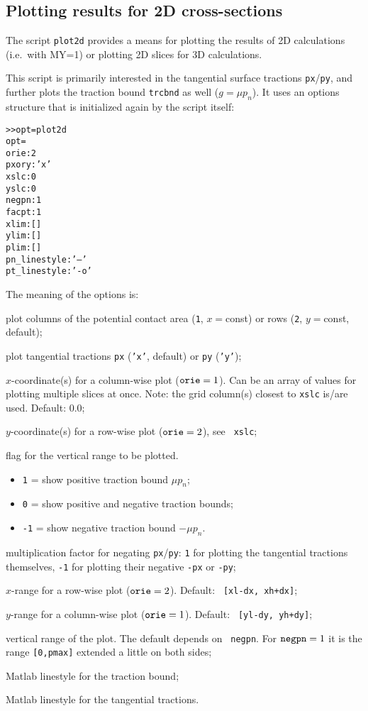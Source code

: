 \documentclass[12pt]{report}
\begin{document}
\subsection{Plotting results for 2D cross-sections}

The script {\tt plot2d} provides a means for plotting the results of 2D
calculations (i.e.\ with MY=1) or plotting 2D slices for 3D calculations.

This script is primarily interested in the tangential surface tractions
{\tt px}/{\tt py}, and further plots the traction bound {\tt trcbnd} as
well ($g=\mu p_n$). It uses an options structure that is initialized again
by the script itself:
\begin{alltt}\small
>> opt=plot2d
opt =
            orie: 2
           pxory: 'x'
            xslc: 0
            yslc: 0
           negpn: 1
           facpt: 1
            xlim: []
            ylim: []
            plim: []
    pn_linestyle: '--'
    pt_linestyle: '-o'
\end{alltt}
The meaning of the options is:
\begin{description}[leftmargin=7em,style=nextline]
\item[orie]  plot columns of the potential contact area ({\tt 1}, $x=$const) or
        rows ({\tt 2}, $y=$const, default);
\item[pxory] plot tangential tractions {\tt px} ({\tt 'x'}, default) or
        {\tt py} ({\tt 'y'});
\item[xslc]  $x$-coordinate(s) for a column-wise plot (${\tt orie}=1$). Can
        be an array of values for plotting multiple slices at once. Note:
        the grid column(s) closest to {\tt xslc} is/are used. Default: 0.0;
\item[yslc]  $y$-coordinate(s) for a row-wise plot (${\tt orie}=2$), see {\tt
        xslc};
\item[negpn] flag for the vertical range to be plotted.
\begin{itemize}
\item {\tt  1} = show positive traction bound  $\mu p_n$;
\item {\tt  0} = show positive and negative traction bounds;
\item {\tt -1} = show negative traction bound $-\mu p_n$.
\end{itemize}
\item[facpt] multiplication factor for negating {\tt px}/{\tt py}: {\tt 1}
        for plotting the tangential tractions themselves, {\tt -1} for
        plotting their negative {\tt -px} or {\tt -py};
\item[xlim]  $x$-range for a row-wise plot (${\tt orie}=2$). Default: {\tt
        [xl-dx, xh+dx]};
\item[ylim]  $y$-range for a column-wise plot (${\tt orie}=1$). Default: {\tt
        [yl-dy, yh+dy]};
\item[plim]  vertical range of the plot. The default depends on {\tt
        negpn}. For ${\tt negpn}=1$ it is the range {\tt [0,pmax]} extended
        a little on both sides;
\item[pn\_linestyle] Matlab linestyle for the traction bound;
\item[pt\_linestyle] Matlab linestyle for the tangential tractions.
\end{description}
\end{document}
